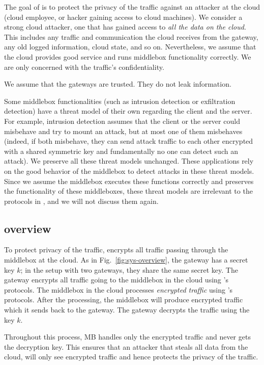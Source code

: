The goal of \sys is to protect the privacy of the traffic against an attacker at the cloud 
(cloud employee, or hacker gaining access to cloud machines). 
We consider a strong cloud attacker, one that has gained access to {\em all the data on the cloud}.
This includes any traffic and communication the cloud receives from the 
gateway, any old logged information, cloud state, and so on. Nevertheless, we assume that 
the cloud provides good service and runs middlebox functionality correctly.  We are only concerned with 
the traffic's confidentiality.

We assume that the gateways are trusted. They do not leak information.


Some middlebox functionalities (such as intrusion detection or exfiltration detection) have a threat model
of their own regarding the client and the server. For example, intrusion detection assumes that 
the client or the server could misbehave and try to mount an attack, but at most one of them misbehaves~\cite{Bro}  
(indeed, if both misbehave, they can send attack traffic to each other encrypted with a shared symmetric key and fundamentally
no one can detect such an attack).  We preserve all these threat models unchanged. These applications rely
on the good behavior of the middlebox to detect attacks in these threat models. Since we assume the middlebox executes
these functions correctly and \sys preserves the functionality of these middleboxes, 
these threat models are irrelevant to the protocols in \sys, and we will not discuss them again. 



\subsection{\sys overview}


To protect privacy of the traffic, \sys encrypts all traffic passing through the middlebox at the cloud. 
As in Fig.~\ref{fig:sys-overview}, the gateway has a secret key $k$; in the setup with two gateways, they share
the same secret key. The gateway encrypts all traffic going to the middlebox in the cloud using \sys's protocols.
The middlebox in the cloud processes {\em encrypted traffic} using \sys's protocols. 
After the processing, the middlebox
will produce encrypted traffic which it sends back to the gateway. The gateway decrypts the traffic using the key $k$.

Throughout this process, MB handles only the encrypted traffic and never gets the decryption key. This ensures
that an attacker that steals all data from the cloud, will only see encrypted traffic and hence protects the privacy of the 
traffic. 

